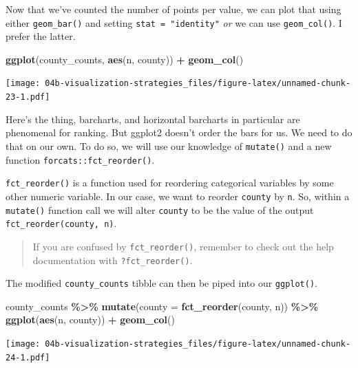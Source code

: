 \documentclass[
]{book}
\newenvironment{Shaded}{\begin{snugshade}}{\end{snugshade}}
\newcommand{\DataTypeTok}[1]{\textcolor[rgb]{0.13,0.29,0.53}{#1}}
\newcommand{\KeywordTok}[1]{\textcolor[rgb]{0.13,0.29,0.53}{\textbf{#1}}}
\newcommand{\NormalTok}[1]{#1}
\newcommand{\OperatorTok}[1]{\textcolor[rgb]{0.81,0.36,0.00}{\textbf{#1}}}
\newcommand{\StringTok}[1]{\textcolor[rgb]{0.31,0.60,0.02}{#1}}
\begin{document}
Now that we've counted the number of points per value, we can plot that using either \texttt{geom\_bar()} and setting \texttt{stat\ =\ "identity"} \emph{or} we can use \texttt{geom\_col()}. I prefer the latter.

\begin{Shaded}
\begin{Highlighting}[]
\KeywordTok{ggplot}\NormalTok{(county\_counts, }\KeywordTok{aes}\NormalTok{(n, county)) }\OperatorTok{+}
\StringTok{  }\KeywordTok{geom\_col}\NormalTok{()}
\end{Highlighting}
\end{Shaded}

\texttt{[image: 04b-visualization-strategies\_files/figure-latex/unnamed-chunk-23-1.pdf]}

Here's the thing, barcharts, and horizontal barcharts in particular are phenomenal for ranking. But ggplot2 doesn't order the bars for us. We need to do that on our own. To do so, we will use our knowledge of \texttt{mutate()} and a new function \texttt{forcats::fct\_reorder()}.

\texttt{fct\_reorder()} is a function used for reordering categorical variables by some other numeric variable. In our case, we want to reorder \texttt{county} by \texttt{n}. So, within a \texttt{mutate()} function call we will alter \texttt{county} to be the value of the output \texttt{fct\_reorder(county,\ n)}.

\begin{quote}
If you are confused by \texttt{fct\_reorder()}, remember to check out the help documentation with \texttt{?fct\_reorder()}.
\end{quote}

The modified \texttt{county\_counts} tibble can then be piped into our \texttt{ggplot()}.

\begin{Shaded}
\begin{Highlighting}[]
\NormalTok{county\_counts }\OperatorTok{\%\textgreater{}\%}\StringTok{ }
\StringTok{  }\KeywordTok{mutate}\NormalTok{(}\DataTypeTok{county =} \KeywordTok{fct\_reorder}\NormalTok{(county, n)) }\OperatorTok{\%\textgreater{}\%}\StringTok{ }
\StringTok{  }\KeywordTok{ggplot}\NormalTok{(}\KeywordTok{aes}\NormalTok{(n, county)) }\OperatorTok{+}
\StringTok{  }\KeywordTok{geom\_col}\NormalTok{()}
\end{Highlighting}
\end{Shaded}

\texttt{[image: 04b-visualization-strategies\_files/figure-latex/unnamed-chunk-24-1.pdf]}
\end{document}
